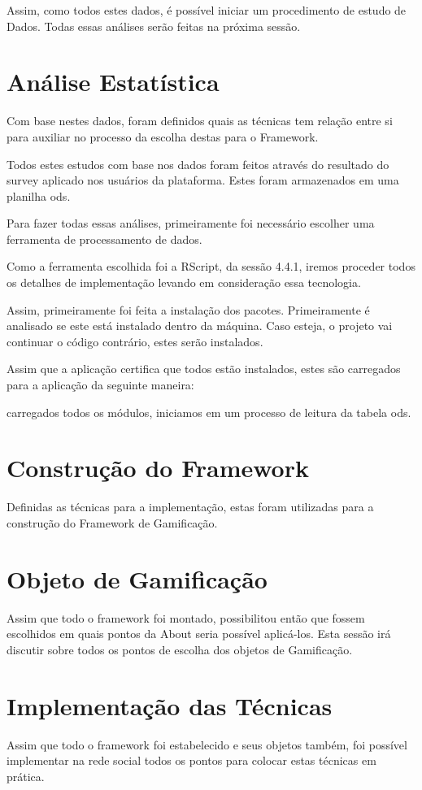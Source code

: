 Assim, como todos estes dados, é possível iniciar um procedimento de estudo de Dados.
Todas essas análises serão feitas na próxima sessão.

\section{Análise Estatística}
\label{sec:gamifição}
Com base nestes dados, foram definidos quais as técnicas tem relação entre si para auxiliar no processo
da escolha destas para o Framework.

Todos estes estudos com base nos dados foram feitos através do resultado do survey aplicado nos usuários
da plataforma. Estes foram armazenados em uma planilha ods.

Para fazer todas essas análises, primeiramente foi necessário escolher uma ferramenta de processamento de dados.

Como a ferramenta escolhida foi a RScript, da sessão 4.4.1, iremos proceder todos os detalhes de implementação
levando em consideração essa tecnologia.


Assim, primeiramente foi feita a instalação dos pacotes. Primeiramente é analisado
se este está instalado dentro da máquina. 
Caso esteja, o projeto vai continuar o código contrário, estes serão instalados.



Assim que a aplicação certifica que todos estão instalados, estes são carregados
para a aplicação da seguinte maneira:



carregados todos os módulos, iniciamos em um processo de leitura da tabela ods.

\section{Construção do Framework}
\label{sec:gamifição}
Definidas as técnicas para a implementação, estas foram utilizadas para a construção do Framework
de Gamificação.

\section{Objeto de Gamificação}
\label{sec:gamifição}
Assim que todo o framework foi montado, possibilitou então que fossem escolhidos em quais
pontos da About seria possível aplicá-los. Esta sessão irá discutir sobre todos os pontos de escolha
dos objetos de Gamificação.

\section{Implementação das Técnicas}
\label{sec:gamifição}
Assim que todo o framework foi estabelecido e seus objetos também, foi possível implementar
na rede social todos os pontos para colocar estas técnicas em prática.
